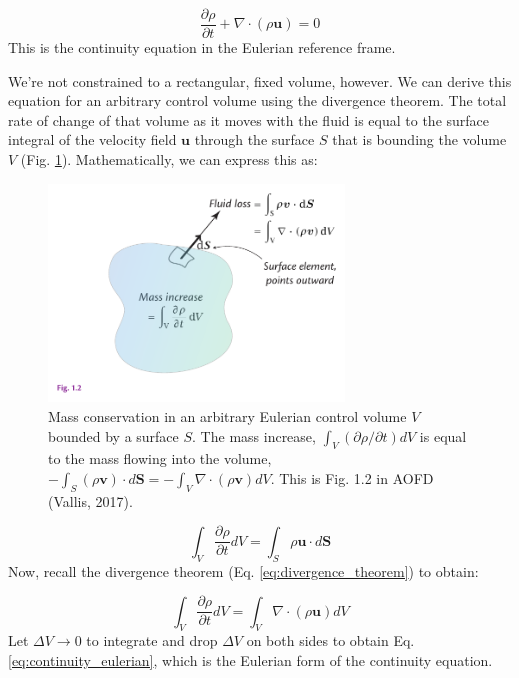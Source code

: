 \documentclass[12pt]{article}
\numberwithin{equation}{section}
\numberwithin{figure}{section}
\numberwithin{table}{section}
\begin{document}
\begin{equation}
  \frac{\partial \rho}{\partial t} + \nabla \cdot (\rho \mathbf{u}) = 0
  \label{eq:continuity_eulerian}
\end{equation}
This is the continuity equation in the Eulerian reference frame.

We're not constrained to a rectangular, fixed volume, however.
We can derive this equation for an arbitrary control volume using the divergence
theorem.
The total rate of change of that volume as it moves with the fluid is equal to
the surface integral of the velocity field $\mathbf{u}$ through the surface
$S$ that is bounding the volume $V$ (Fig. \ref{fig:continuity2}).
Mathematically, we can express this as:

\begin{figure}[h]
  \centering
  \includegraphics[width=0.7\textwidth]{assets/fig_continuity2.pdf}
  \caption{
    Mass conservation in an arbitrary Eulerian control volume $V$ bounded by a
    surface $S$. The mass increase, $\int_V(\partial \rho/\partial t)dV$
    is equal to the mass flowing into the volume,
    $-\int_S(\rho\mathbf{v}) \cdot d\mathbf{S} = -\int_V \nabla \cdot (\rho\mathbf{v})dV$.
    This is Fig. 1.2 in AOFD (Vallis, 2017).
  }
  \label{fig:continuity2}
\end{figure}

\begin{equation}
  \int_V \frac{\partial \rho}{\partial t} dV = \int_S \rho \mathbf{u} \cdot d\mathbf{S}
\end{equation}
Now, recall the divergence theorem (Eq. \ref{eq:divergence_theorem}) to obtain:

\begin{equation}
  \int_V \frac{\partial \rho}{\partial t} dV = \int_V \nabla \cdot (\rho \mathbf{u}) dV
\end{equation}
Let $\Delta V \to 0$ to integrate and drop $\Delta V$ on both sides to obtain
Eq. \ref{eq:continuity_eulerian}, which is the Eulerian form of the continuity
equation.
\end{document}
